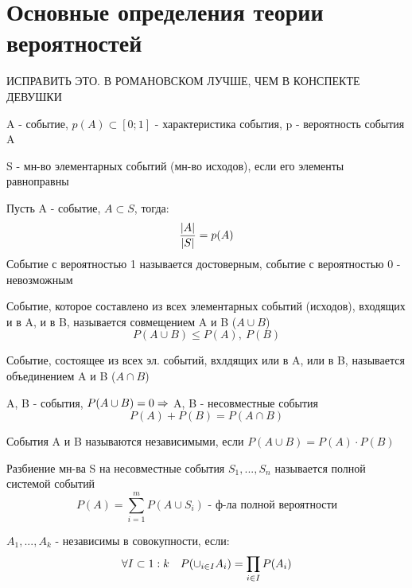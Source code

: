 \documentclass[discrete.tex]{subfiles}
\begin{document}
\section{Основные определения теории вероятностей}
ИСПРАВИТЬ ЭТО. В РОМАНОВСКОМ ЛУЧШЕ, ЧЕМ В КОНСПЕКТЕ ДЕВУШКИ
\begin{definition}
  A - событие, $p(A) \subset [0;1]$ - характеристика события, p - вероятность события A
\end{definition}

\begin{definition}
  S - мн-во элементарных событий (мн-во исходов), если его элементы равноправны
\end{definition}

\begin{definition}
  Пусть A - событие, $A \subset S$, тогда:
  \[\frac{\left|A\right|}{\left|S\right|} = p(A)\]
  Событие с вероятностью 1 называется достоверным, событие с вероятностью 0 - невозможным
\end{definition}

\begin{definition}
  Событие, которое составлено из всех элементарных событий (исходов), входящих и в A, и в B, называется совмещением A и B ($A \cup B$)
  \[P(A \cup B) \leqslant P(A),\ P(B)\]
\end{definition}

\begin{definition}
  Событие, состоящее из всех эл. событий, вхлдящих или в A, или в B, называется объединением A и B ($A \cap B$)
\end{definition}

\begin{definition}
  A, B - события, $P(A \cup B) = 0 \Rightarrow$ A, B - несовместные события
  \[P(A) + P(B) = P(A \cap B)\]
\end{definition}

\begin{definition}
  События A и B называются независимыми, если $P(A \cup B) = P(A) \cdot P(B)$
\end{definition}

\begin{definition}
  Разбиение мн-ва S на несовместные события $S_1,...,S_n$ называется полной системой событий
  \[P(A) = \sum_{i=1}^m P(A \cup S_i) \text{ - ф-ла полной вероятности}\]
\end{definition}

\begin{definition}
  $A_1,...,A_k$ - независимы в совокупности, если:
  \[\forall I \subset 1:k \quad P(\cup_{i \in I}A_i) = \prod_{i \in I} P(A_i)\]

\end{definition}
\end{document}
